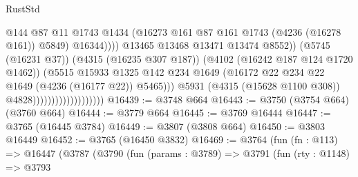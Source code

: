 \begin{lexlean}{RustStd}
\begin{coremodule}
                                                        @144
                                                        @87
                                                        @11
                                                        @1743
                                                        @1434
                                                        (@16273
                                                          @161
                                                          @87
                                                          @161
                                                          @1743
                                                          (@4236 (@16278 @161))
                                                          @5849)
                                                        @16344))))
                                                @13465
                                                @13468
                                                @13471
                                                @13474
                                                @8552))
                                            (@5745 (@16231 @37))
                                            (@4315 (@16235 @307 @187))
                                            (@4102 (@16242 @187 @124 @1720 @1462))
                                            (@5515
                                              @15933
                                              @1325
                                              @142
                                              @234
                                              @1649
                                              (@16172
                                                @22
                                                @234
                                                @22
                                                @1649
                                                (@4236 (@16177 @22))
                                                @5465)))
                                          @5931
                                          (@4315 (@15628 @1100 @308))
                                          @4828)))))))))))))))))))
@16439 := @3748 @664
@16443 := @3750 (@3754 @664) (@3760 @664)
@16444 := @3779 @664
@16445 := @3769 @16444
@16447 := @3765 (@16445 @3784)
@16449 := @3807 (@3808 @664)
@16450 := @3803 @16449
@16452 := @3765 (@16450 @3832)
@16469 := @3764
    (fun (fn : @113) =>
    @16447
      (@3787
        (@3790
          (fun (params : @3789) =>
          @3791
            (fun (rty : @1148) =>
            @3793

\end{coremodule}
\end{lexlean}
